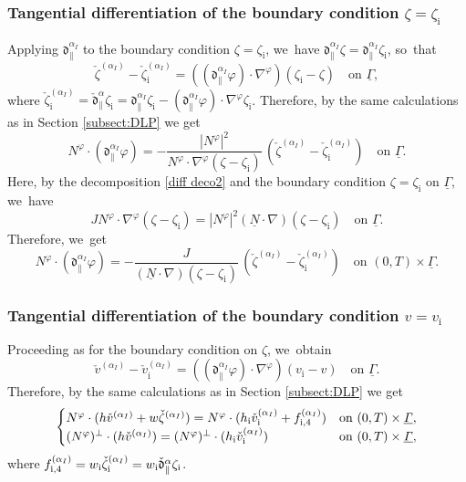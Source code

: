 \documentclass[10pt]{amsart}
\newcommand{\dpar}{{\mathfrak d}_{\parallel}}
\newcommand{\ul}[1]{\underline{#1}}
\newcommand{\itGamma}{\mathit{\Gamma}}
\newcommand{\cmfalpha}{\check{\mathfrak{d}}^{\alpha}}
\theoremstyle{definition}
\begin{document}
\subsubsection{Tangential differentiation of the boundary condition $\zeta=\zeta_\mathrm{i}$}
Applying $\dpar^{\alpha_I}$ to the boundary condition $\zeta=\zeta_\mathrm{i}$, we~have $\dpar^{\alpha_I}\zeta=\dpar^{\alpha_I}\zeta_\mathrm{i}$, so~that
\[
\check{\zeta}^{(\alpha_I)}-\check{\zeta}_\mathrm{i}^{(\alpha_I)} = ((\dpar^{\alpha_I}\varphi)\cdot\nabla^\varphi)(\zeta_\mathrm{i}-\zeta)
\quad\mbox{on } \ul{\itGamma},
\]
where $\check{\zeta}_\mathrm{i}^{(\alpha_I)} = \cmfalpha_\parallel \zeta_\mathrm{i}
= \dpar^{\alpha_I}\zeta_\mathrm{i}-(\dpar^{\alpha_I}\varphi)\cdot\nabla^\varphi\zeta_\mathrm{i}$.
Therefore, by the same calculations as in Section \ref{subsect:DLP} we get
\[
N^\varphi\cdot(\dpar^{\alpha_I}\varphi)
= -\frac{|N^\varphi|^2}{N^\varphi\cdot\nabla^\varphi(\zeta-\zeta_\mathrm{i})}\,(\check{\zeta}^{(\alpha_I)}-\check{\zeta}_\mathrm{i}^{(\alpha_I)})\quad\text{on }\ul{\itGamma}.
\]
Here, by the decomposition \eqref{diff deco2} and the boundary condition $\zeta=\zeta_\mathrm{i}$ on $\ul{\itGamma}$, we~have
\[
JN^\varphi\cdot\nabla^\varphi(\zeta-\zeta_\mathrm{i})=|N^\varphi|^2(\ul{N}\cdot\nabla)(\zeta-\zeta_\mathrm{i})\quad\text{on }\ul{\itGamma}.
\]
Therefore, we~get
\begin{equation}\label{EqPhi2}
N^\varphi\cdot(\dpar^{\alpha_I}\varphi)
= - \frac{J}{(\ul{N}\cdot\nabla)(\zeta-\zeta_\mathrm{i})}\,(\check{\zeta}^{(\alpha_I)}-\check{\zeta}_\mathrm{i}^{(\alpha_I)})
\quad\text{on } (0,T)\times\ul{\itGamma}.
\end{equation}

\subsubsection{Tangential differentiation of the boundary condition $v=v_\mathrm{i}$}
Proceeding as for the boundary condition on $\zeta$, we~obtain
\[
\check{v}^{(\alpha_I)}-\check{v}_\mathrm{i}^{(\alpha_I)} = ((\dpar^{\alpha_I}\varphi)\cdot\nabla^\varphi)(v_\mathrm{i}-v)
\quad\mbox{on } \ul{\itGamma}.
\]
Therefore, by the same calculations as in Section \ref{subsect:DLP} we get
\begin{equation}\label{QLBC0}
\begin{cases}
N^\varphi\cdot(h\check{v}^{(\alpha_I)}+w\check{\zeta}^{(\alpha_I)})
= N^\varphi\cdot(h_\mathrm{i}\check{v}_\mathrm{i}^{(\alpha_I)}+f_{{\rm i},4}^{(\alpha_I)}) &\text{on } (0,T)\times\ul{\itGamma}, \\
(N^\varphi)^\perp\cdot(h\check{v}^{(\alpha_I)})=(N^\varphi)^\perp\cdot(h_\mathrm{i}\check{v}_\mathrm{i}^{(\alpha_I)}) &\text{on } (0,T)\times\ul{\itGamma},
\end{cases}
\end{equation}
where $f_{{\rm i},4}^{(\alpha_I)}= w_\mathrm{i} \check{\zeta}_\mathrm{i}^{(\alpha_I)} = w_\mathrm{i} \cmfalpha_\parallel \zeta_\mathrm{i}$.
\end{document}
